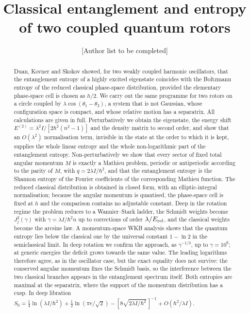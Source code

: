 \documentclass[preprint,12pt]{elsarticle}
\begin{document}
\begin{frontmatter}

\title{Classical entanglement and entropy of two coupled quantum rotors}

\author[a]{[Author list to be completed]}
\address[a]{[Affiliation]}

\begin{abstract}
Duan, Kovner and Skokov showed, for two weakly coupled harmonic oscillators,
that the entanglement entropy of a highly excited eigenstate coincides with the
Boltzmann entropy of the reduced classical phase-space distribution, provided
the elementary phase-space cell is chosen as $h/2$. We carry out the same
programme for two rotors on a circle coupled by $\lambda\cos(\theta_{1}-\theta_{2})$,
a system that is not Gaussian, whose configuration space is compact, and whose
relative motion has a separatrix. All calculations are given in full.
Perturbatively we obtain the eigenstate, the energy shift
$E^{(2)}=\lambda^{2}I/[2\hbar^{2}(n^{2}-1)]$ and the density matrix to second
order, and show that an $O(\lambda^{2})$ normalisation term, invisible in the
state at the order to which it is kept, supplies the whole linear entropy and
the whole non-logarithmic part of the entanglement entropy. Non-perturbatively we
show that every sector of fixed total angular momentum $M$ is exactly a Mathieu
problem, periodic or antiperiodic according to the parity of $M$, with
$q=2\lambda I/\hbar^{2}$, and that the entanglement entropy is the Shannon
entropy of the Fourier coefficients of the corresponding Mathieu function. The
reduced classical distribution is obtained in closed form, with an
elliptic-integral normalisation; because the angular momentum is quantised, the
phase-space cell is fixed at $h$ and the comparison contains no adjustable
constant. Deep in the rotation regime the problem reduces to a Wannier--Stark
ladder, the Schmidt weights become $J_{j}^{2}(\gamma)$ with
$\gamma=\lambda I/\hbar^{2}n$ up to corrections of order $\lambda/E_{\rm rel}$,
and the classical weights become the arcsine law. A momentum-space WKB analysis
shows that the quantum entropy lies below the classical one by the universal
constant $1-\ln2$ in the semiclassical limit. In deep rotation we confirm the
approach, as $\gamma^{-1/3}$, up to $\gamma=10^{6}$; at generic energies the
deficit grows towards the same value. The leading logarithms therefore agree, as in the
oscillator case, but the exact equality does not survive: the conserved
angular momentum fixes the Schmidt basis, so the interference between the two
classical branches appears in the entanglement spectrum itself. Both entropies
are maximal at the separatrix, where the support of the momentum distribution
has a cusp. In deep libration
$S_{0}=\tfrac14\ln(\lambda I/\hbar^{2})+\tfrac12\ln(\pi e/\sqrt2)
-[8\sqrt{2\lambda I/\hbar^{2}}\,]^{-1}+O(\hbar^{2}/\lambda I)$.
\end{abstract}


\end{frontmatter}
\end{document}
